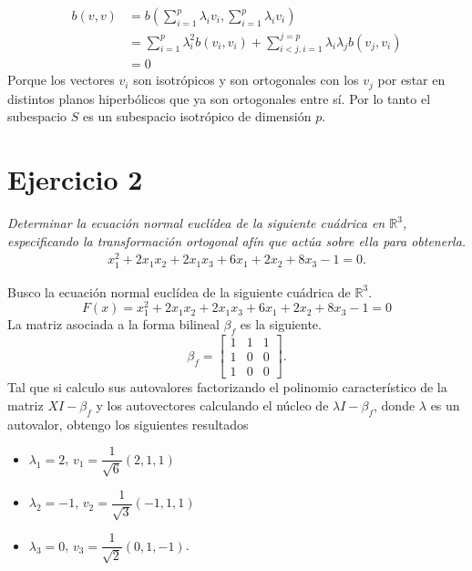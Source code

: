 \begin{align*}
	b(v,v) &= b\left( \sum_{i=1}^{p} \lambda_{i}v_{i}, \sum_{i=1}^{p} \lambda_{i}v_{i}\right) \\
	& = \sum_{i=1}^{p} \lambda_{i}^{2} b(v_i,v_i) + \sum_{i<j, i=1}^{j=p} \lambda_{i}\lambda_{j} b(v_j,v_i) \\
	& = 0
\end{align*}
Porque los vectores $v_i$ son isotrópicos y son ortogonales con los $v_j$  por estar en distintos planos hiperbólicos que ya son ortogonales entre sí. Por lo tanto el subespacio $S$ es un subespacio isotrópico de dimensión $p$.

\bigskip


\section*{Ejercicio 2}
\textit{Determinar la ecuación normal euclídea de la siguiente cu\'adrica en $\mathbb R^3$, especificando la transformaci\'on ortogonal af\'in que act\'ua sobre ella para obtenerla.}
\begin{align}
x_1^2 + 2x_1x_2 + 2x_1x_3 + 6x_1 + 2x_2 + 8x_3 - 1 = 0.
\end{align}

\bigskip

Busco la ecuación normal euclídea de la siguiente cuádrica de $\mathbb R ^3$. 
\[ F(x) = x_1 ^2 +2x_1 x_2 +2x_1 x_3 +6x_1 +2x_2 +8x_3 -1  = 0\]
La matriz asociada a la forma bilineal $\beta_f$ es la siguiente.
 \[ \beta_f =
 \begin{bmatrix}
 1 & 1 & 1  \\
 1 & 0 & 0 \\
 1 & 0 & 0
 \end{bmatrix}.
 \]
Tal que si calculo sus autovalores factorizando el polinomio característico de la matriz $XI - \beta_f$ y los autovectores calculando el núcleo de $\lambda I - \beta_f$, donde $\lambda$ es un autovalor,  obtengo los siguientes resultados 
\begin{itemize}
	\item $\lambda_1=2$, $v_1= \dfrac{1}{\sqrt{6}}(2,1,1)$ 
	\item $\lambda_2=-1 $, $v_2= \dfrac{1}{\sqrt{3}}(-1,1,1)$
	\item $\lambda_3=0$, $v_3= \dfrac{1}{\sqrt{2}}(0,1,-1)$.
\end{itemize}

